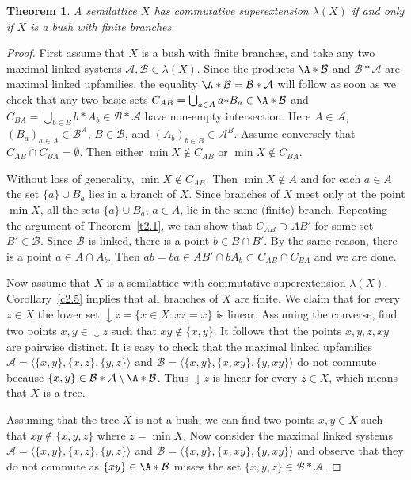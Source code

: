 \documentclass{amsart}
\newtheorem{theorem}[lem]{Theorem}
\theoremstyle{definition}
\begin{document}
\begin{theorem}\label{t2.6} A semilattice $X$ has commutative superextension $\lambda(X)$ if and only if $X$ is a bush with finite branches.
\end{theorem}

\begin{proof} First assume that $X$ is a bush with finite branches, and take any two maximal linked systems ${\mathcal A},\mathcal B\in\lambda(X)$. Since the products $\A*\mathcal B$ and $\mathcal B*{\mathcal A}$ are maximal linked upfamilies, the equality $\A*\mathcal B=\mathcal B*{\mathcal A}$ will follow as soon as we check that any two basic sets $C_{AB}=\bigcup_{a\in A}a{*}B_a\in\A*\mathcal B$ and $C_{BA}=\bigcup_{b\in B}b{*}A_b\in\mathcal B*{\mathcal A}$ have non-empty intersection. Here $A\in{\mathcal A}$, $(B_a)_{a\in A}\in \mathcal B^A$, $B\in\mathcal B$, and $(A_b)_{b\in B}\in{\mathcal A}^B$.  Assume conversely that $C_{AB}\cap C_{BA}=\emptyset$. Then either $\min X\notin C_{AB}$ or $\min X\notin C_{BA}$.

Without loss of generality, $\min X\notin C_{AB}$. Then $\min X\notin A$ and for each $a\in A$ the set $\{a\}\cup B_a$ lies in a branch of $X$. Since branches of $X$ meet only at the point $\min X$, all the sets $\{a\}\cup B_a$, $a\in A$, lie in the same (finite) branch. Repeating the argument of Theorem~\ref{t2.1}, we can show that $C_{AB}\supset AB'$ for some set $B'\in\mathcal B$. Since $\mathcal B$ is linked, there is a point $b\in B\cap B'$. By the same reason, there is a point $a\in A\cap A_b$. Then $ab=ba\in AB'\cap bA_b\subset C_{AB}\cap C_{BA}$ and we are done.
\smallskip

Now assume that $X$ is a semilattice with commutative superextension  $\lambda(X)$. Corollary~\ref{c2.5} implies that all branches of $X$ are finite. We claim that for every $z\in X$ the lower set ${\downarrow}z=\{x\in X:xz=x\}$ is linear. Assuming the converse, find two points $x,y\in{\downarrow}z$ such that $xy\notin\{x,y\}$. It follows that the points $x,y,z,xy$ are pairwise distinct. It is easy to check that the maximal linked upfamilies ${\mathcal A}={\langle}\{x,y\},\{x,z\},\{y,z\}{\rangle}$ and $\mathcal B={\langle}\{x,y\},\{x,xy\},\{y,xy\}{\rangle}$ do not commute because $\{x,y\}\in\mathcal B*{\mathcal A}\setminus\A*\mathcal B$. Thus ${\downarrow}z$ is linear for every $z\in X$, which means that $X$ is a tree.

Assuming that the tree $X$ is not a bush, we can find two points $x,y\in X$ such that $xy\notin\{x,y,z\}$ where $z=\min X$. Now consider the maximal linked systems ${\mathcal A}={\langle} \{x,y\},\{x,z\},\{y,z\}{\rangle}$ and $\mathcal B={\langle}\{x,y\},\{x,xy\},\{y,xy\}{\rangle}$ and observe that they do not commute as $\{xy\}\in \A*\mathcal B$ misses the set $\{x,y,z\}\in\mathcal B*{\mathcal A}$.
\end{proof}
\end{document}
